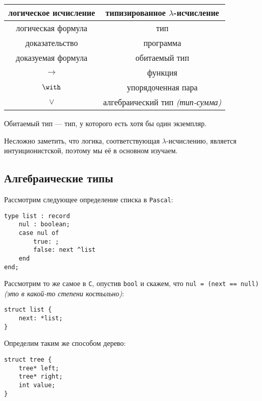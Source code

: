 \begin{tabular}{|c|c|}
    \hline
    логическое исчисление & типизированное \(\lambda\)-исчисление   \\ \hline
    логическая формула    & тип                                     \\
    доказательство        & программа                               \\
    доказуемая формула    & обитаемый тип                           \\
    \( \to \)             & функция                                 \\
    \(\with\)             & упорядоченная пара                      \\
    \(\lor\)              & алгебраический тип \textit{(тип-сумма)} \\
    \hline
\end{tabular}

\begin{remark}
    Обитаемый тип --- тип, у которого есть хотя бы один экземпляр.
\end{remark}

Несложно заметить, что логика, соответствующая \(\lambda\)-исчислению, является интуиционистской, поэтому мы её в основном изучаем.

\subsection{Алгебраические типы}

Рассмотрим следующее определение списка в \texttt{Pascal}:

\begin{verbatim}
type list : record
    nul : boolean;
    case nul of
        true: ;
        false: next ^list
    end
end;
\end{verbatim}

Рассмотрим то же самое в \texttt{C}, опустив \texttt{bool} и скажем, что \texttt{nul = (next == null)} \textit{(это в какой-то степени костыльно)}:

\begin{verbatim}
struct list {
    next: *list;
}
\end{verbatim}

Определим таким же способом дерево:

\begin{verbatim}
struct tree {
    tree* left;
    tree* right;
    int value;
}
\end{verbatim}

